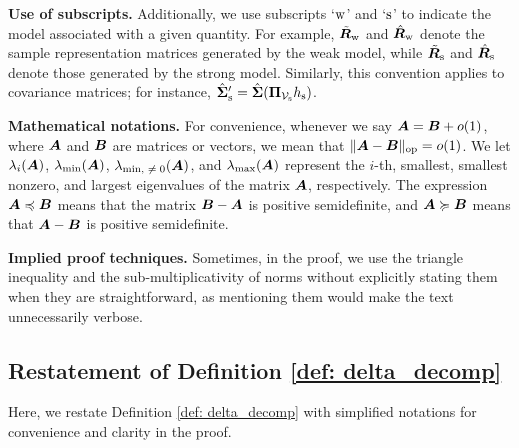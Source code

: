 \textbf{Use of subscripts.}
Additionally, we use subscripts `$\text{w}$' and `$\text{s}$' to indicate the model associated with a given quantity. For example, $\tilde{{\bm{R}}}_{\text{w}}$ and $\hat{{\bm{R}}}_{\text{w}}$ denote the sample representation matrices generated by the weak model, while $\tilde{{\bm{R}}}_{\text{s}}$ and $\hat{{\bm{R}}}_{\text{s}}$ denote those generated by the strong model. Similarly, this convention applies to covariance matrices; for instance, $\hat{{\bm{\Sigma}}}_{\text{s}}' = \hat{{\bm{\Sigma}}}({\bm{\Pi}}_{{\mathcal{V}}_{\text{s}}} h_{\text{s}})$.

\textbf{Mathematical notations.} For convenience, whenever we say ${\bm{A}} = {\bm{B}} + o(1)$, where ${\bm{A}}$ and ${\bm{B}}$ are matrices or vectors, we mean that $\lVert {\bm{A}} - {\bm{B}} \rVert_{\mathrm{op}} = o(1)$. We let $\lambda_i({\bm{A}})$, $\lambda_{\min}({\bm{A}})$, $\lambda_{\text{min, $\neq 0$}}({\bm{A}})$, and $\lambda_{\max}({\bm{A}})$ represent the $i$-th, smallest, smallest nonzero, and largest eigenvalues of the matrix ${\bm{A}}$, respectively. The expression ${\bm{A}} \preccurlyeq {\bm{B}} $ means that the matrix ${\bm{B}}-{\bm{A}}$ is positive semidefinite, and ${\bm{A}} \succcurlyeq {\bm{B}} $ means that ${\bm{A}}-{\bm{B}}$ is positive semidefinite. 

\textbf{Implied proof techniques.} Sometimes, in the proof, we use the triangle inequality and the sub-multiplicativity of norms without explicitly stating them when they are straightforward, as mentioning them would make the text unnecessarily verbose.



\subsection{Restatement of Definition \ref{def: delta_decomp}}

Here, we restate Definition \ref{def: delta_decomp} with simplified notations for convenience and clarity in the proof.

